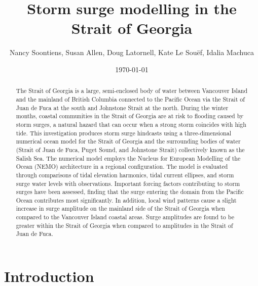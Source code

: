 \documentclass[pdftex,10pt]{article}
\title{Storm surge modelling in the Strait of Georgia}
\author{Nancy Soontiens, Susan Allen, Doug Latornell, Kate Le Sou\"{e}f, Idalia Machuca}
\date{\today}
\begin{document}
\maketitle

\begin{abstract}
The Strait of Georgia is a large, semi-enclosed body of water between Vancouver Island and the mainland of British Columbia connected to the Pacific Ocean via the Strait of Juan de Fuca at the south and Johnstone Strait at the north. During the winter months, coastal communities in the Strait of Georgia are at risk to flooding caused by storm surges, a natural hazard that can occur when a strong storm coincides with high tide. This investigation produces storm surge hindcasts using a three-dimensional numerical ocean model for the Strait of Georgia and the surrounding bodies of water (Strait of Juan de Fuca, Puget Sound, and Johnstone Strait) collectively known as the Salish Sea. The numerical model employs the Nucleus for European Modelling of the Ocean (NEMO) architecture in a regional configuration. The model is evaluated through comparisons of tidal elevation harmonics, tidal current ellipses, and storm surge water levels with observations. Important forcing factors contributing to storm surges have been assessed, finding that the surge entering the domain from the Pacific Ocean contributes most significantly. In addition, local wind patterns cause a slight increase in surge amplitude on the mainland side of the Strait of Georgia when compared to the Vancouver Island coastal areas. Surge amplitudes are found to be greater within the Strait of Georgia when compared to amplitudes in the Strait of Juan de Fuca. 
\end{abstract}

\section{Introduction}\label{sec:intro}
\end{document}
